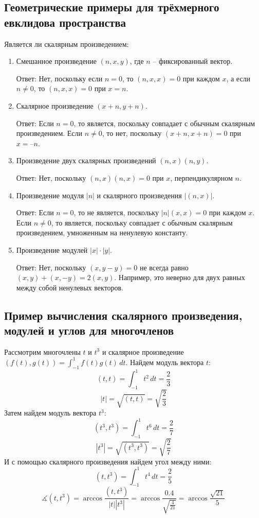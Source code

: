 \documentclass[12pt]{article}
\begin{document}
\subsection{Геометрические примеры для трёхмерного евклидова пространства}

Является ли скалярным произведением:
\begin{enumerate}
    \item Смешанное произведение $(n, x, y)$, где $n$ – фиксированный вектор.

          Ответ: Нет, поскольку если $n = 0$, то $(n, x, x) = 0$ при каждом $x$, а если $n\neq 0$, то $(n, x, x) = 0$ при $x = n$.

    \item Скалярное произведение $(x + n, y + n)$.

          Ответ: Если $n = 0$, то является, поскольку совпадает с обычным скалярным произведением. Если $n \neq 0$, то нет,
          поскольку $(x + n, x + n) = 0$ при $x = –n$.

    \item Произведение двух скалярных произведений $(n, x)(n, y)$.

          Ответ: Нет, поскольку $(n, x)(n, x) = 0$ при $x$, перпендикулярном $n$.

    \item Произведение модуля $|n|$ и скалярного произведения $|(n, x)|$.

          Ответ: Если $n = 0$, то не является, поскольку $|n|(x, x) = 0$ при каждом $x$. Если $n \neq 0$, то является, поскольку
          совпадает с обычным скалярным произведением, умноженным на ненулевую константу.

    \item Произведение модулей $|x|\cdot |y|$.

          Ответ: Нет, поскольку $(x, y - y) = 0$ не всегда равно $(x, y) + (x, -y) = 2(x, y)$. Например, это неверно для двух
          равных между собой ненулевых векторов.
\end{enumerate}

\subsection{Пример вычисления скалярного произведения, модулей и углов для многочленов}
Рассмотрим многочлены $t$ и $t^3$ и скалярное произведение $(f(t),g(t))=\int_{-1}^{1} f(t)g(t)\,dt$.
Найдем модуль вектора $t$:
$$(t,t)=\int_{-1}^{1} t^2\,dt =\frac{2}{3}$$
$$|t|=\sqrt{(t,t)}=\sqrt{\frac{2}{3}}$$
Затем найдем модуль вектора $t^3$:
$$(t^3,t^3)=\int_{-1}^{1} t^6\,dt=\frac{2}{7}$$
$$|t^3|=\sqrt{(t^3,t^3)}=\sqrt{\frac{2}{7}}$$
И с помощью скалярного произведения найдем угол между ними:
$$(t,t^3)=\int_{-1}^{1} t^4\,dt =\frac{2}{5}$$
$$\measuredangle(t,t^3)=\arccos \frac{(t,t^3)}{|t||t^3|}=\arccos \frac{0.4}{\sqrt{\frac{4}{21}}}=\arccos \frac{\sqrt{21}}{5} $$
\end{document}
